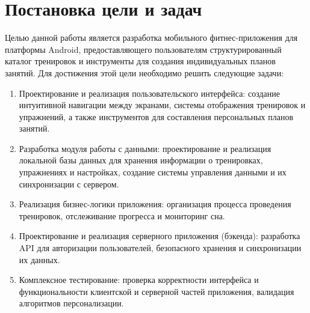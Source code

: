 \section{Постановка цели и задач}

Целью данной работы является разработка мобильного фитнес-приложения для платформы Android, предоставляющего пользователям структурированный каталог тренировок и инструменты для создания индивидуальных планов занятий. Для достижения этой цели необходимо решить следующие задачи:

\begin{enumerate}
	\item Проектирование и реализация пользовательского интерфейса: создание интуитивной навигации между экранами, системы отображения тренировок и упражнений, а также инструментов для составления персональных планов занятий.

	\item Разработка модуля работы с данными: проектирование и реализация локальной базы данных для хранения информации о тренировках, упражнениях и настройках, создание системы управления данными и их синхронизации с сервером.

	\item Реализация бизнес-логики приложения: организация процесса проведения тренировок, отслеживание прогресса и мониторинг сна.

	\item Проектирование и реализация серверного приложения (бэкенда): разработка API для авторизации пользователей, безопасного хранения и синхронизации их данных.

	\item Комплексное тестирование: проверка корректности интерфейса и функциональности клиентской и серверной частей приложения, валидация алгоритмов персонализации.
\end{enumerate}

